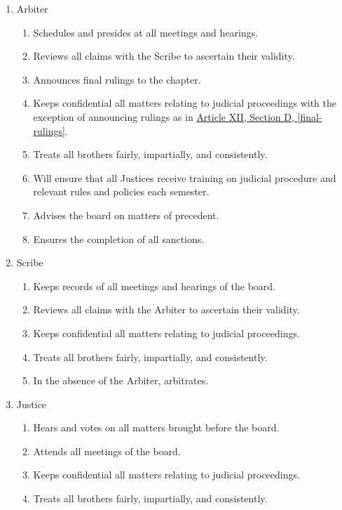 	\begin{enumerate}

		\item Arbiter
			\begin{enumerate}
				\item Schedules and presides at all meetings and hearings.
				\item Reviews all claims with the Scribe to ascertain their validity.
				\item Announces final rulings to the chapter. \label{final-rulings}
				\item Keeps confidential all matters relating to judicial proceedings with the exception of announcing rulings as in \hyperref[final-rulings]{Article XII, Section D, \autoref*{final-rulings}}. 
				\item Treats all brothers fairly, impartially, and consistently.
				\item Will ensure that all Justices receive training on judicial procedure and relevant rules and policies each semester.
				\item Advises the board on matters of precedent.
				\item Ensures the completion of all sanctions.
			\end{enumerate}

		\item Scribe
			\begin{enumerate}
				\item Keeps records of all meetings and hearings of the board.
				\item Reviews all claims with the Arbiter to ascertain their validity.
				\item Keeps confidential all matters relating to judicial proceedings.
				\item Treats all brothers fairly, impartially, and consistently.
				\item In the absence of the Arbiter, arbitrates.
			\end{enumerate}

		\item Justice
			\begin{enumerate}
				\item Hears and votes on all matters brought before the board.
				\item Attends all meetings of the board.
				\item Keeps confidential all matters relating to judicial proceedings.
				\item Treats all brothers fairly, impartially, and consistently.
			\end{enumerate}


\end{enumerate}

